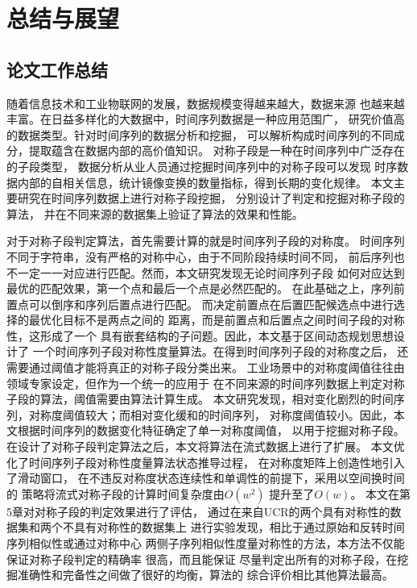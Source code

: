 
\chapter{总结与展望}
\section{论文工作总结}
随着信息技术和工业物联网的发展，数据规模变得越来越大，数据来源
也越来越丰富。在日益多样化的大数据中，时间序列数据是一种应用范围广，
研究价值高的数据类型。针对时间序列的数据分析和挖掘，
可以解析构成时间序列的不同成分，提取蕴含在数据内部的高价值知识。
对称子段是一种在时间序列中广泛存在的子段类型，
数据分析从业人员通过挖掘时间序列中的对称子段可以发现
时序数据内部的自相关信息，统计镜像变换的数量指标，得到长期的变化规律。
本文主要研究在时间序列数据上进行对称子段挖掘，
分别设计了判定和挖掘对称子段的算法，
并在不同来源的数据集上验证了算法的效果和性能。

对于对称子段判定算法，首先需要计算的就是时间序列子段的对称度。
时间序列不同于字符串，没有严格的对称中心，由于不同阶段持续时间不同，
前后序列也不一定一一对应进行匹配。然而，本文研究发现无论时间序列子段
如何对应达到最优的匹配效果，第一个点和最后一个点是必然匹配的。
在此基础之上，序列前置点可以倒序和序列后置点进行匹配。
而决定前置点在后置匹配候选点中进行选择的最优化目标不是两点之间的
距离，而是前置点和后置点之间时间子段的对称性，这形成了一个
具有嵌套结构的子问题。因此，本文基于区间动态规划思想设计了
一个时间序列子段对称性度量算法。在得到时间序列子段的对称度之后，
还需要通过阈值才能将真正的对称子段分类出来。
工业场景中的对称度阈值往往由领域专家设定，但作为一个统一的应用于
在不同来源的时间序列数据上判定对称子段的算法，阈值需要由算法计算生成。
本文研究发现，相对变化剧烈的时间序列，对称度阈值较大；而相对变化缓和的时间序列，
对称度阈值较小。因此，本文根据时间序列的数据变化特征确定了单一对称度阈值，
以用于挖掘对称子段。
在设计了对称子段判定算法之后，本文将算法在流式数据上进行了扩展。
本文优化了时间序列子段对称性度量算法状态推导过程，
在对称度矩阵上创造性地引入了滑动窗口，
在不违反对称度状态连续性和单调性的前提下，采用以空间换时间的
策略将流式对称子段的计算时间复杂度由$O\left(w^2\right)$
提升至了$O\left(w\right)$。
本文在第5章对对称子段的判定效果进行了评估，
通过在来自UCR的两个具有对称性的数据集和两个不具有对称性的数据集上
进行实验发现，相比于通过原始和反转时间序列相似性或通过对称中心
两侧子序列相似性度量对称性的方法，本方法不仅能保证对称子段判定的精确率
很高，而且能保证
尽量判定出所有的对称子段，在挖掘准确性和完备性之间做了很好的均衡，算法的
综合评价相比其他算法最高。

